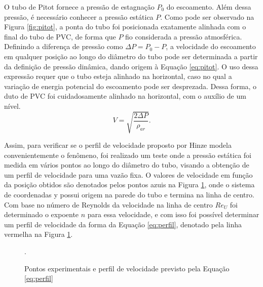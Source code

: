 O tubo de Pitot fornece a pressão de estagnação $P_{0}$ do escoamento. Além dessa pressão, é necessário conhecer a pressão estática $P$. Como pode ser observado na Figura \ref{fig:pitot}, a ponta do tubo foi posicionada exatamente alinhada com o final do tubo de PVC, de forma que $P$ fio considerada a pressão atmosférica. Definindo a diferença de pressão como $\Delta P = P_{0} - P$, a velocidade do escoamento em qualquer posição ao longo do diâmetro do tubo pode ser determinada a partir da definição de pressão dinâmica, dando origem à Equação \eqref{eq:pitot}. O uso dessa expressão requer que o tubo esteja alinhado na horizontal, caso no qual a variação de energia potencial do escoamento pode ser desprezada. Dessa forma, o duto de PVC foi cuidadosamente alinhado na horizontal, com o auxílio de um nível.
\begin{equation} \label{eq:pitot}
V = \sqrt{\frac{2\Delta P}{\rho_{ar}}}.
\end{equation}

Assim, para verificar se o perfil de velocidade proposto por Hinze modela convenientemente o fenômeno, foi realizado um teste onde a pressão estática foi medida em vários pontos ao longo do diâmetro do tubo, visando a obtenção de um perfil de velocidade para uma vazão fixa. O valores de velocidade em função da posição obtidos são denotados pelos pontos azuis na Figura \ref{fig:vteoexp}, onde o sistema de coordenadas y possui origem na parede do tubo e termina na linha de centro. Com base no número de Reynolds da velocidade na linha de centro $Re_{U}$ foi determinado o expoente $n$ para essa velocidade, e com isso foi possível determinar um perfil de velocidade da forma da Equação \eqref{eq:perfil}, denotado pela linha vermelha na Figura \ref{fig:vteoexp}.

\begin{figure}[!ht]
	\centering
	\caption{Pontos experimentais e perfil de velocidade previsto pela Equação \eqref{eq:perfil}}.
	\label{fig:vteoexp}
\end{figure}


